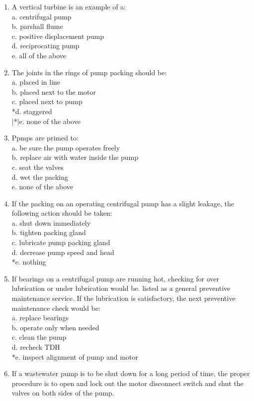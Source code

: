 \begin{enumerate}[1.]
\item A vertical turbine is an example of a:\\
a. centrifugal pump\\
b. parshall flume\\
c. positive displacement pump\\
d. reciprocating pump\\
e. all of the above\\
\item The joints in the rings of pump packing should be:\\
a. placed in line\\
b. placed next to the motor\\
c. placed next to pump\\
*d. staggered\\
|*|e. none of the above\\
\item Ppmps are primed to:\\
a. be sure the pump operates freely\\
b. replace air with water inside the pump\\
c. seat the valves\\
d. wet the packing\\
e. none of the above\\
\item If the packing on an operating centrifugal pump has a slight leakage, the following action should be taken:\\
a. shut down immediately\\
b. tighten packing gland\\
c. lubricate pump packing gland\\
d. decrease pump speed and head\\
*e. nothing\\
\item If bearings on a centrifugal pump are running hot, checking for over lubrication or under lubrication would be. listed as a general preventive maintenance service. If the lubrication is satisfactory, the next preventive maintenance check would be:\\
a. replace bearings\\
b. operate only when needed\\
c. clean the pump\\
d. recheck TDH\\
*e. inspect alignment of pump and motor\\
\item If a wastewater pump is to be shut down for a long period of time, the proper procedure is to open and lock out the motor disconnect switch and shut the valves on both sides of the pump.\\

\end{enumerate}
